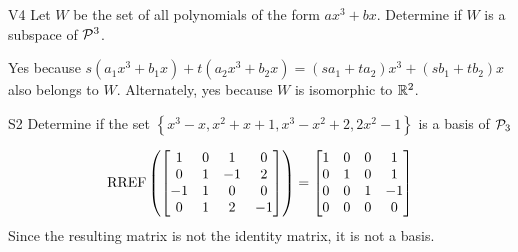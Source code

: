 \documentclass{sbgLAquiz}
\begin{document}
\begin{extract}\newpage\end{extract}
\begin{problem}{V4} Let $W$ be the set of all polynomials of the form
\(ax^3+bx\).  Determine if $W$ is a subspace of \(\P^3\).
\end{problem}
\begin{solution}
Yes because \(s(a_1x^3+b_1x)+t(a_2x^3+b_2x)=
(sa_1+ta_2)x^3+(sb_1+tb_2)x\) also belongs to \(W\).
Alternately, yes because \(W\) is isomorphic to \(\IR^2\).
\end{solution}


\begin{problem}{S2}
Determine if the set $\left\{ x^3-x, x^2+x+1, x^3-x^2+2, 2x^2-1 \right\}$ is a basis of $\P_3$
\end{problem}
\begin{solution}
$$\RREF\left(\begin{bmatrix} 1 & 0 & 1 & 0 \\ 0 & 1 & -1 & 2 \\ -1 & 1 & 0 & 0 \\ 0 & 1 & 2 & -1 \end{bmatrix} \right)= \begin{bmatrix} 1 & 0 &0 & 1 \\ 0 & 1 & 0 & 1 \\ 0 & 0 & 1 & -1 \\ 0 & 0 & 0 & 0 \end{bmatrix}$$
Since the resulting matrix is not the identity matrix, it is not a basis.
\end{solution}
\end{document}
